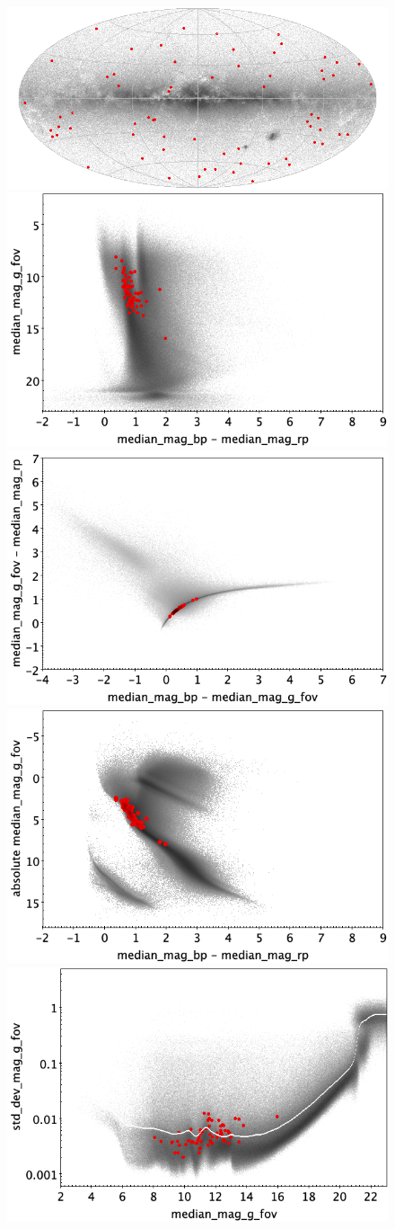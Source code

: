 \documentclass[longauth]{aa}
\begin{document}
\begin{appendix}
\begin{figure}
\centering
{} \includegraphics[width=0.6\hsize]{figures/appendix/EP_trn_sky.png} \\ %
\vspace{4mm}
 \includegraphics[width=0.45\hsize]{figures/appendix/EP_trn_cm.png}  %
\hspace{2mm}
 \includegraphics[width=0.45\hsize]{figures/appendix/EP_trn_cc.png} \\ %
\vspace{4mm}
 \includegraphics[width=0.45\hsize]{figures/appendix/EP_trn_cam.png}  %
\hspace{2mm}
 \includegraphics[width=0.45\hsize]{figures/appendix/EP_trn_msd.png} \\ %

\end{figure}
\end{appendix}
\end{document}
